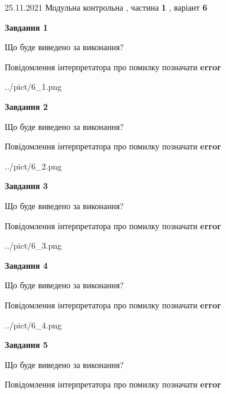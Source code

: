 \documentclass[10pt, ukrainian]{article}
\begin{document}
{25.11.2021 Модульна контрольна , частина \textbf { 1 }, варіант  \No \textbf { 6 }\par}
{
\begin {large}

{\begin {center}\textbf{Завдання 1}\end {center}}\par
Що буде виведено за виконання? \par
Повідомлення інтерпретатора про помилку позначати \textbf{error}

\begin{center}
	{../pict/6_1.png}
\end{center}
\newpage

{\begin {center}\textbf{Завдання 2}\end {center}}\par
Що буде виведено за виконання? \par
Повідомлення інтерпретатора про помилку позначати \textbf{error}

\begin{center}
	{../pict/6_2.png}
\end{center}
\newpage

{\begin {center}\textbf{Завдання 3}\end {center}}\par
Що буде виведено за виконання? \par
Повідомлення інтерпретатора про помилку позначати \textbf{error}

\begin{center}
	{../pict/6_3.png}
\end{center}
\newpage

{\begin {center}\textbf{Завдання 4}\end {center}}\par
Що буде виведено за виконання? \par
Повідомлення інтерпретатора про помилку позначати \textbf{error}

\begin{center}
	{../pict/6_4.png}
\end{center}
\newpage

{\begin {center}\textbf{Завдання 5}\end {center}}\par
Що буде виведено за виконання? \par
Повідомлення інтерпретатора про помилку позначати \textbf{error}


\end{large}}
\end{document}
